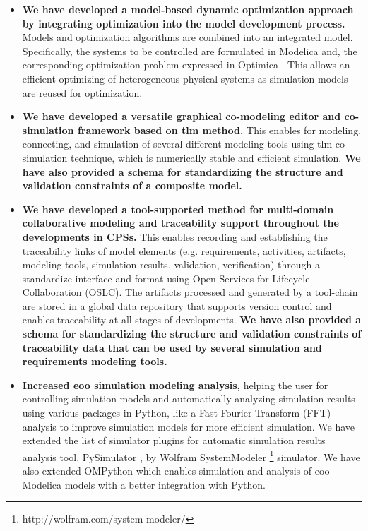 \begin{itemize}
	
\item \textbf{We have developed a model-based dynamic optimization approach by integrating optimization into the model development process.}
Models and optimization algorithms are combined into an integrated model. Specifically, the systems to be controlled are formulated in Modelica and, the corresponding optimization problem expressed in Optimica \cite{optimica}. This allows an efficient optimizing of heterogeneous physical systems as simulation models are reused for optimization.

\item \textbf{We have developed a versatile graphical co-modeling editor and co-simulation framework based on \acrshort{tlm} method.} This enables for modeling, connecting, and simulation of several different modeling tools using \acrshort{tlm} co-simulation technique, which is numerically stable and efficient simulation. \textbf{We have also provided a schema for standardizing the structure and validation constraints of a composite model.} 

\item \textbf{We have developed a tool-supported method for multi-domain collaborative modeling and traceability support throughout the developments in CPSs.} This enables recording and establishing the traceability links of model elements (e.g. requirements, activities, artifacts, modeling tools, simulation results, validation, verification) through a standardize interface and format using Open Services for Lifecycle Collaboration (OSLC). The artifacts processed and generated by a tool-chain are stored in a global data repository that supports version control and enables traceability at all stages of developments.\textbf{ We have also provided a schema for standardizing the structure and validation constraints of traceability data that can be used by several simulation and requirements modeling tools.} 

\item \textbf{Increased \acrshort{eoo} simulation modeling analysis,} helping the user for controlling simulation models and automatically analyzing simulation results using various packages in Python, like a Fast Fourier Transform (FFT) analysis to improve simulation models for more efficient simulation. We have extended the list of simulator plugins for automatic simulation results analysis tool, PySimulator \cite{pysimulator}, by Wolfram SystemModeler \footnote{http://wolfram.com/system-modeler/} simulator. We have also extended OMPython \cite{ompython} which enables simulation and analysis of \acrshort{eoo} Modelica models with a better integration with Python.

\end{itemize}


